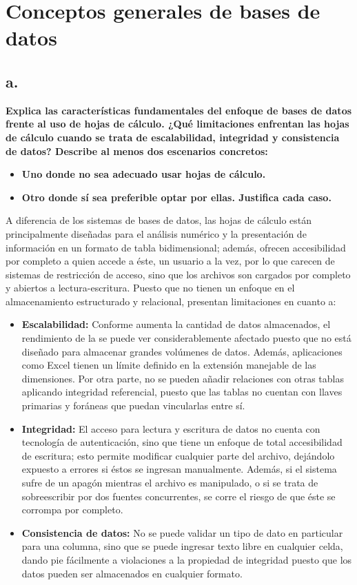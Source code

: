 \section{Conceptos generales de bases de datos}

\subsection*{a.}


\textbf{Explica las características fundamentales del enfoque de bases de datos frente al uso de hojas de cálculo. ¿Qué limitaciones enfrentan las hojas de cálculo cuando se trata de escalabilidad, integridad y consistencia de datos? Describe al menos dos escenarios concretos:}
\begin{itemize}
    \item \textbf{Uno donde no sea adecuado usar hojas de cálculo.}
    \item \textbf{Otro donde sí sea preferible optar por ellas. Justifica cada caso.}
\end{itemize}

A diferencia de los sistemas de bases de datos, las hojas de cálculo están principalmente diseñadas para el análisis numérico y la presentación de información en un formato de tabla bidimensional; además, ofrecen accesibilidad por completo a quien accede a éste, un usuario a la vez, por lo que carecen de sistemas de restricción de acceso, sino que los archivos son cargados por completo y abiertos a lectura-escritura. Puesto que no tienen un enfoque en el almacenamiento estructurado y relacional, presentan limitaciones en cuanto a:
\begin{itemize}
    \item \textbf{Escalabilidad:} Conforme aumenta la cantidad de datos almacenados, el rendimiento de la se puede ver considerablemente afectado puesto que no está diseñado para almacenar grandes volúmenes de datos. Además, aplicaciones como Excel tienen un límite definido en la extensión manejable de las dimensiones. Por otra parte, no se pueden añadir relaciones con otras tablas aplicando integridad referencial, puesto que las tablas no cuentan con llaves primarias y foráneas que puedan vincularlas entre sí.
    \item \textbf{Integridad:} El acceso para lectura y escritura de datos no cuenta con tecnología de autenticación, sino que tiene un enfoque de total accesibilidad de escritura; esto permite modificar cualquier parte del archivo, dejándolo expuesto a errores si éstos se ingresan manualmente. Además, si el sistema sufre de un apagón mientras el archivo es manipulado, o si se trata de sobreescribir por dos fuentes concurrentes, se corre el riesgo de que éste se corrompa por completo.
    \item \textbf{Consistencia de datos:} No se puede validar un tipo de dato en particular para una columna, sino que se puede ingresar texto libre en cualquier celda, dando pie fácilmente a violaciones a la propiedad de integridad puesto que los datos pueden ser almacenados en cualquier formato.
\end{itemize}

